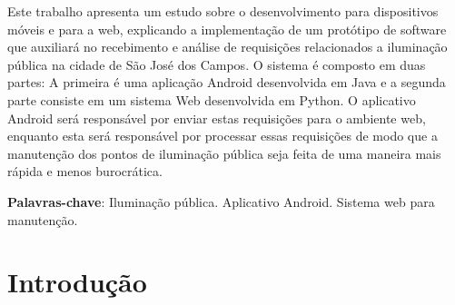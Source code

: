 \documentclass[
	article,			%
	11pt,				%
	oneside,			%
	a4paper,			%
	english,			%
	brazil,				%
	sumario=tradicional
	]{abntex2}
\begin{document}

\frenchspacing


%
%
\maketitle

\begin{resumoumacoluna}
   Este trabalho apresenta um estudo sobre o desenvolvimento para dispositivos móveis e para a web, explicando a implementação de um protótipo de software que auxiliará no recebimento e análise de requisições relacionados a iluminação pública na cidade de São José dos Campos.
   O sistema é composto em duas partes: A primeira é uma aplicação Android desenvolvida em Java e a segunda parte consiste em um sistema Web desenvolvida em Python.
   O aplicativo Android será responsável por enviar estas requisições para o ambiente web, enquanto esta será responsável por processar essas requisições de modo que a manutenção dos pontos de iluminação pública seja feita de uma maneira mais rápida e menos burocrática.
 \vspace{\onelineskip}

 \noindent
 \textbf{Palavras-chave}: Iluminação pública. Aplicativo Android. Sistema web para manutenção.
\end{resumoumacoluna}


\textual

\section*{Introdução}
\end{document}

